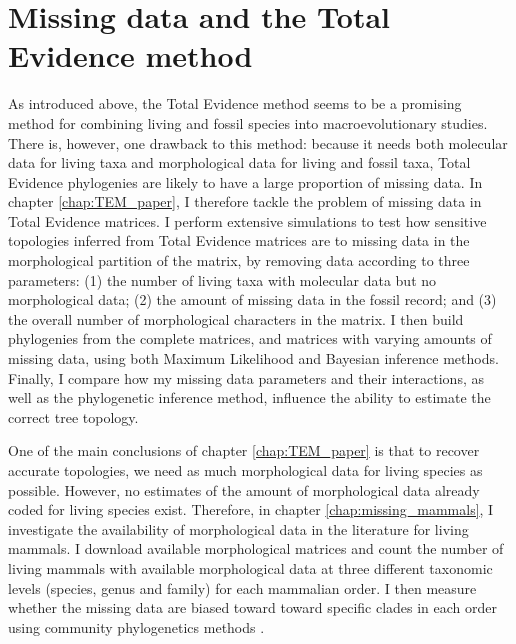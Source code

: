 %
%


\section{Missing data and the Total Evidence method}
As introduced above, the Total Evidence method seems to be a promising method for combining living and fossil species into macroevolutionary studies.
There is, however, one drawback to this method: because it needs both molecular data for living taxa and morphological data for living and fossil taxa, Total Evidence phylogenies are likely to have a large proportion of missing data.
In chapter \ref{chap:TEM_paper}, I therefore tackle the problem of missing data in Total Evidence matrices.
I perform extensive simulations to test how sensitive topologies inferred from Total Evidence matrices are to missing data in the morphological partition of the matrix, by removing data according to three parameters: (1) the number of living taxa with molecular data but no morphological data; (2) the amount of missing data in the fossil record; and (3) the overall number of morphological characters in the matrix.
I then build phylogenies from the complete matrices, and matrices with varying amounts of missing data, using both Maximum Likelihood and Bayesian inference methods.
Finally, I compare how my missing data parameters and their interactions, as well as the phylogenetic inference method, influence the ability to estimate the correct tree topology.

One of the main conclusions of chapter \ref{chap:TEM_paper} is that to recover accurate topologies, we need as much morphological data for living species as possible.
However, no estimates of the amount of morphological data already coded for living species exist.
Therefore, in chapter \ref{chap:missing_mammals}, I investigate the availability of morphological data in the literature for living mammals.
I download available morphological matrices and count the number of living mammals with available morphological data at three different taxonomic levels (species, genus and family) for each mammalian order.
I then measure whether the missing data are biased toward toward specific clades in each order using community phylogenetics methods \citep{webb2002phylogenies}.


